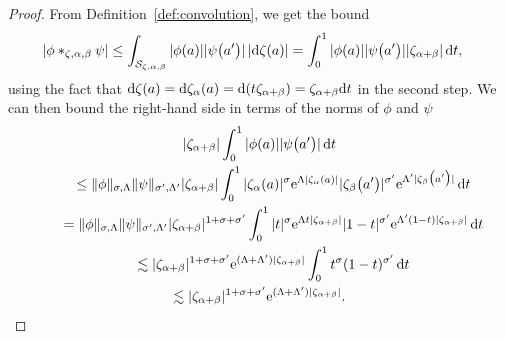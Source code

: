 \documentclass[pdftex]{sigma}
\numberwithin{equation}{section}
\begin{document}
\begin{proof}
From Definition~\ref{def:convolution}, we get the bound
\begin{align*}
\left|\phi\ast_{\zeta,\alpha,\beta}\psi\right|&\le\int_{\mathcal{S}_{\zeta,\alpha,\beta}} |\phi(a)| |\psi\bigl(a'\bigr)| \,|{\rm d}\zeta(a)| = \int_0^1|\phi(a)| |\psi\bigl(a'\bigr)| |\zeta_{\alpha+\beta}| \,{\rm d}t,
\end{align*}
using the fact that ${\rm d}\zeta(a)={\rm d}\zeta_\alpha(a)={\rm d}(t\zeta_{\alpha+\beta})=\zeta_{\alpha+\beta} {\rm d}t$ in the second step. We can then bound the right-hand side in terms of the norms of $\phi$ and $\psi$
\begin{gather*}
|\zeta_{\alpha+\beta}|\int_0^1 |\phi(a)| |\psi\bigl(a'\bigr)| \,{\rm d}t
\\
\qquad\le \|\phi\|_{\sigma,\Lambda} \|\psi\|_{\sigma',\Lambda'} |\zeta_{\alpha+\beta}|\int_0^1 |\zeta_\alpha(a)|^{\sigma}{\rm e}^{\Lambda |\zeta_{\alpha}(a)|} |\zeta_\beta\bigl(a'\bigr)|^{\sigma'}{\rm e}^{\Lambda' |\zeta_{\beta}\bigl(a'\bigr)|} \,{\rm d}t\\
\qquad= \|\phi\|_{\sigma,\Lambda} \|\psi\|_{\sigma',\Lambda'} |\zeta_{\alpha+\beta}|^{1+\sigma+\sigma'}\int_0^1 |t|^{\sigma}{\rm e}^{\Lambda t |\zeta_{\alpha+\beta}|} |1-t|^{\sigma'}{\rm e}^{\Lambda' (1-t)|\zeta_{\alpha+\beta}|} \,{\rm d}t\\
\qquad\lesssim |\zeta_{\alpha+\beta}| ^{1+\sigma+\sigma'} {\rm e}^{(\Lambda+\Lambda')|\zeta_{\alpha+\beta}|}\int_0^1 t^{\sigma} (1-t)^{\sigma'} \,{\rm d}t\\
\qquad\lesssim |\zeta_{\alpha+\beta}| ^{1+\sigma+\sigma'} {\rm e}^{(\Lambda+\Lambda')|\zeta_{\alpha+\beta}|}.\tag*{\qed}
\end{gather*}\renewcommand{\qed}{}
\end{proof}
\end{document}
